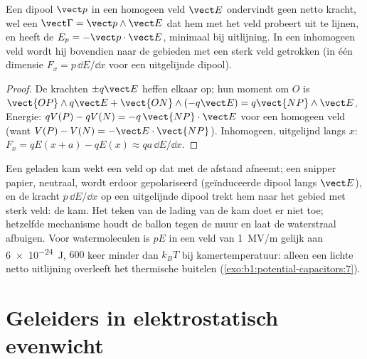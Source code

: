 \begin{proposition}\label{prop:b1:potential-capacitors:dipoleinfield}
Een dipool $\vect p$ in een homogeen veld $\vect E$ ondervindt geen netto kracht, wel een
 $\vect\Gamma = \vect p\wedge\vect E$ dat hem met het veld probeert uit te
lijnen, en heeft de  $E_p = -\vect p\cdot\vect E$,
minimaal bij uitlijning. In een inhomogeen veld wordt hij bovendien naar
de gebieden met een sterk veld getrokken (in één dimensie $F_x = p\,\dd E/\dd x$
voor een uitgelijnde dipool).
\end{proposition}

\begin{proof}
De krachten $\pm q\vect E$ heffen elkaar op; hun moment om $O$ is $\vect{OP}\wedge
q\vect E + \vect{ON}\wedge(-q\vect E) = q\vect{NP}\wedge\vect E$. Energie:
$qV(P) - qV(N) = -q\,\vect{NP}\cdot\vect E$ voor een homogeen veld (want $V(P)
- V(N) = -\vect E\cdot\vect{NP}$). Inhomogeen, uitgelijnd langs $x$: $F_x =
qE(x + a) - qE(x) \approx qa\,\dd E/\dd x$.
\end{proof}

\begin{example}\label{ex:b1:potential-capacitors:comb}
Een geladen kam wekt een veld op dat met de afstand afneemt; een snipper
papier, neutraal, wordt erdoor gepolariseerd (geïnduceerde dipool langs $\vect E$), en
de kracht $p\,\dd E/\dd x$ op een uitgelijnde dipool trekt hem naar het
gebied met sterk veld: de kam. Het teken van de lading van de kam doet er niet toe;
hetzelfde mechanisme houdt de ballon tegen de muur en laat de
waterstraal afbuigen. Voor watermoleculen is $pE$ in een veld van \qty{1}{MV/m}
gelijk aan \qty{6e-24}{J}, $600$ keer minder dan $k_BT$ bij kamertemperatuur:
alleen een lichte netto uitlijning overleeft het thermische buitelen
(\cref{exo:b1:potential-capacitors:7}).
\end{example}

\section{Geleiders in elektrostatisch evenwicht}


